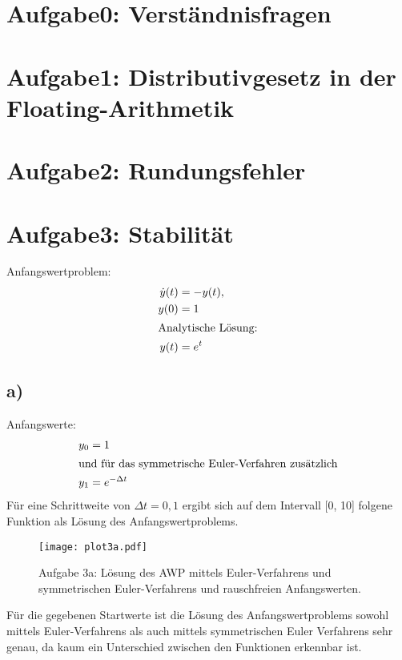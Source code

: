 



\maketitle

\section*{Aufgabe0: Verständnisfragen}

\section*{Aufgabe1: Distributivgesetz in der Floating-Arithmetik}

\section*{Aufgabe2: Rundungsfehler}

\section*{Aufgabe3: Stabilität}
Anfangswertproblem:
\begin{align*}
  \dot{y}(t)&=-y(t), \\ y(0)&=1 \\
  \intertext{Analytische Lösung:} y(t)&=e^{t}
\end{align*}

\subsection*{a)}
Anfangswerte:
\begin{align*}
  y_0&=1\\
  \intertext{und für das symmetrische Euler-Verfahren zusätzlich}
  y_1&=e^{-\Delta t}
\end{align*}
Für eine Schrittweite von $\Delta t = 0,1$ ergibt sich auf dem Intervall [0, 10] folgene Funktion als Lösung des Anfangswertproblems.
\FloatBarrier
\begin{figure}[h]
    \centering
    \texttt{[image: plot3a.pdf]}
    \caption{Aufgabe 3a: Lösung des AWP mittels Euler-Verfahrens und symmetrischen Euler-Verfahrens und rauschfreien Anfangswerten.}
    \label{fig:plot3a}
\end{figure}
\FloatBarrier
Für die gegebenen Startwerte ist die Lösung des Anfangswertproblems sowohl mittels Euler-Verfahrens als auch mittels symmetrischen Euler Verfahrens sehr genau, da kaum ein Unterschied zwischen den Funktionen erkennbar ist.


